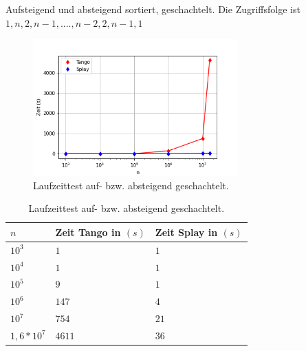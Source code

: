 \documentclass[a4paper,12pt]{article}
\begin{document}
\noindent Aufsteigend und absteigend sortiert, geschachtelt. Die Zugriffsfolge ist $1, n, 2, n- 1,...., n - 2, 2, n -1, 1$
\begin{figure}[H]
	\centering
	\includegraphics[width=0.7\textwidth]{"Medien/laufzeittest/diagramm/sorted3"}
	\caption{Laufzeittest auf- bzw. absteigend geschachtelt.}
\end{figure}
\begin{table}[H]
	\begin{center}
		\begin{tabular}[c]{|l|l|l|}
			\hline
			$n$ & Zeit Tango in $\left(s\right)$ &Zeit Splay in $\left(s\right)$ \\
			\hline
			$10^3$ & $1$ &$1$ \\
			\hline
			$10^4$  & $1$ &$1$  \\
			\hline
			$10^5$  & $9$ &$1$  \\
			\hline
			$10^6$  & $147$ &$4$  \\
			\hline
			$10^7$  & $754$ &$21$  \\
			\hline
			$1,6 *10^7$  & $4611$ &$36$  \\
			\hline
		\end{tabular}
		\caption{Laufzeittest auf- bzw. absteigend geschachtelt.} 
	\end{center}
\end{table}
\end{document}
